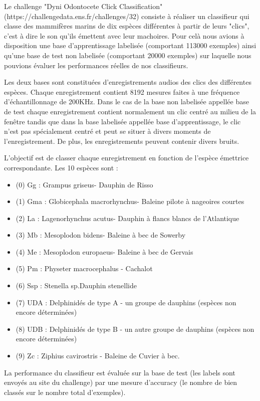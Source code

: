 Le challenge "Dyni Odontocete Click Classification" (https://challengedata.ens.fr/challenges/32) consiste à réaliser un classifieur qui classe des mammifères marins de dix espèces différentes à partir de leurs "clics", c'est à dire le son qu'ils émettent avec leur machoires.
Pour celà nous avions à disposition une base d'apprentissage labelisée (comportant 113000 exemples) ainsi qu'une base de test non labelisée (comportant 20000 exemples) sur laquelle nous pouvions évaluer les performances réelles de nos classifieurs.

Les deux bases sont constituées d'enregistrements audios des clics des différentes espèces. Chaque enregistrement contient 8192 mesures faites à une fréquence d'échantillonnage de 200KHz. Dans le cas de la base non labelisée appellée base de test chaque enregistrement contient normalement un clic centré au milieu de la fenêtre tandis que dans la base labelisée appellée base d'apprentissage, le clic n'est pas spécialement centré et peut se situer à divers moments de l'enregistrement. De plus, les enregistrements peuvent contenir divers bruits.

L'objectif est de classer chaque enregistrement en fonction de l'espèce émettrice correspondante. Les 10 espèces sont :
\begin{itemize}
\item (0) Gg : Grampus griseus- Dauphin de Risso
\item (1) Gma : Globicephala macrorhynchus- Baleine pilote à nageoires courtes
\item (2) La : Lagenorhynchus acutus- Dauphin à flancs blancs de l'Atlantique
\item (3) Mb : Mesoplodon bidens- Baleine à bec de Sowerby
\item (4) Me : Mesoplodon europaeus- Baleine à bec de Gervais
\item (5) Pm : Physeter macrocephalus - Cachalot
\item (6) Ssp : Stenella sp.Dauphin stenellide
\item (7) UDA : Delphinidés de type A - un groupe de dauphins (espèces non encore déterminées)
\item (8) UDB : Delphinidés de type B - un autre groupe de dauphins (espèces non encore déterminées)
\item (9) Zc : Ziphius cavirostris - Baleine de Cuvier à bec.
\end{itemize}

La performance du classifieur est évaluée sur la base de test (les labels sont envoyés au site du challenge) par une mesure d'accuracy (le nombre de bien classés sur le nombre total d'exemples).

